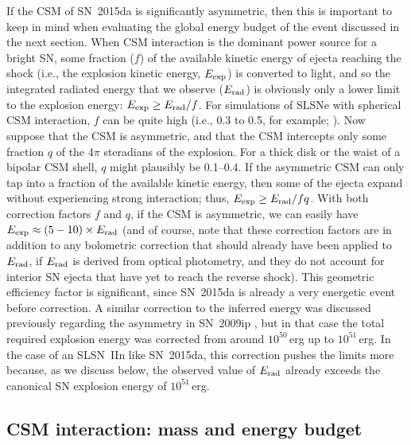 \documentclass[fleqn,usenatbib,useAMS]{mnras}
\begin{document}
If the CSM of SN~2015da is significantly asymmetric, then this is
important to keep in mind when evaluating the global energy budget of
the event discussed in the next section.  When CSM interaction is the
dominant power source for a bright SN, some fraction ($f$) of the
available kinetic energy of ejecta reaching the shock (i.e., the explosion kinetic energy, $E_{\rm exp}$) is converted to
light, and so the integrated radiated energy that we observe  ($E_{\rm
  rad}$) is obviously only a lower limit to the explosion energy:
 $E_{\rm exp} \ge E_{\rm rad}/f$.  For simulations of SLSNe with spherical CSM
interaction, $f$ can be quite high (i.e., 0.3 to 0.5,
for example; \citealt{vm10}).  Now suppose that the CSM is asymmetric,
and that the CSM intercepts only some fraction $q$ of the $4\pi$
steradians of the explosion.  For a thick disk or the waist of a
bipolar CSM shell, $q$ might plausibly be 0.1--0.4.  If the asymmetric
CSM can only tap into a fraction of the available kinetic energy, then
some of the ejecta expand without experiencing strong interaction;
thus, $E_{\rm exp} \ge E_{\rm rad}/fq$.  With both correction factors
$f$ and $q$, if the CSM is asymmetric, we can easily have $E_{\rm exp}
\approx (5-10) \times E_{\rm rad}$ (and of course, note that these
correction factors are in addition to any bolometric correction that
should already have been applied to $E_{\rm rad}$, if $E_{\rm rad}$ is
derived from optical photometry, and they do not account for interior 
SN ejecta that have yet to reach the reverse shock).  This geometric efficiency factor is
significant, since SN~2015da is already a very energetic event before
correction.  A similar correction to the inferred energy was discussed
previously regarding the asymmetry in SN~2009ip
\citep{mauerhan14,smith14}, but in that case the total required
explosion energy was corrected from around $10^{50}$\,erg up to
$10^{51}$\,erg.  In the case of an SLSN~IIn like SN~2015da, this
correction pushes the limits more because, as we discuss below, the
observed value of $E_{\rm rad}$ already exceeds the canonical SN
explosion energy of $10^{51}$\,erg.


\subsection{CSM interaction: mass and energy budget}
\end{document}
